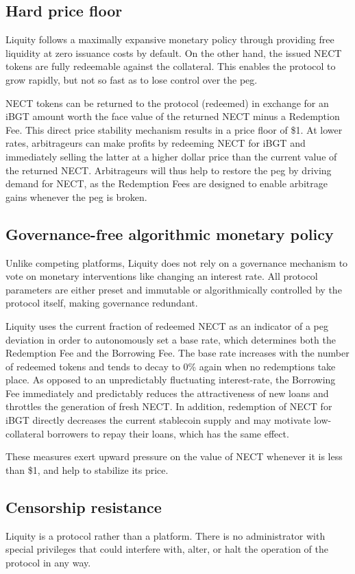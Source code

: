 \documentclass{article}
\begin{document}
\subsection{Hard price floor}
Liquity follows a maximally expansive monetary policy through providing free liquidity at zero issuance costs by default. On the other hand, the issued NECT tokens are fully redeemable against the collateral. This enables the protocol to grow rapidly, but not so fast as to lose control over the peg.

NECT tokens can be returned to the protocol (redeemed) in exchange for an iBGT amount worth the face value of the returned NECT minus a Redemption Fee. This direct price stability mechanism results in a price floor of \$1. At lower rates, arbitrageurs can make profits by redeeming NECT for iBGT and immediately selling the latter at a higher dollar price than the current value of the returned NECT. Arbitrageurs will thus help to restore the peg by driving demand for NECT, as the Redemption Fees are designed to enable arbitrage gains whenever the peg is broken.

\subsection{Governance-free algorithmic monetary policy}
Unlike competing platforms, Liquity does not rely on a governance mechanism to vote on monetary interventions like changing an interest rate. All protocol parameters are either preset and immutable or algorithmically controlled by the protocol itself, making governance redundant.

Liquity uses the current fraction of redeemed NECT as an indicator of a peg deviation in order to autonomously set a base rate, which determines both the Redemption Fee and the Borrowing Fee. The base rate increases with the number of redeemed tokens and tends to decay to 0\% again when no redemptions take place. As opposed to an unpredictably fluctuating interest-rate, the Borrowing Fee immediately and predictably reduces the attractiveness of new loans and throttles the generation of fresh NECT. In addition, redemption of NECT for iBGT directly decreases the current stablecoin supply and may motivate low-collateral borrowers to repay their loans, which has the same effect. 

These measures exert upward pressure on the value of NECT whenever it is less than \$1, and help to stabilize its price.

\subsection{Censorship resistance}
Liquity is a protocol rather than a platform. There is no administrator with special privileges that could interfere with, alter, or halt the operation of the protocol in any way.
\end{document}
